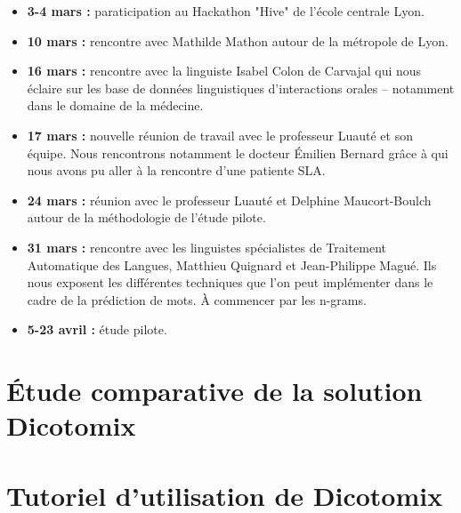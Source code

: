 \documentclass[11pt,a4paper]{article}
\theoremstyle{plain}
\theoremstyle{definition}
\begin{document}
\begin{itemize}
        \item \textbf{3-4 mars : } paraticipation au Hackathon "Hive" de l'école centrale Lyon. \\
        \item \textbf{10 mars : } rencontre avec Mathilde Mathon autour de la métropole de Lyon. \\
        \item \textbf{16 mars : } rencontre avec la linguiste Isabel Colon de Carvajal qui nous éclaire sur les base de données linguistiques d'interactions orales -- notamment 
        dans le domaine de la médecine. \\
        \item \textbf{17 mars : } nouvelle réunion de travail avec le professeur Luauté et son équipe. Nous rencontrons notamment le docteur Émilien Bernard 
        grâce à qui nous avons pu aller à la rencontre d'une patiente SLA. \\
        \item \textbf{24 mars : } réunion avec le professeur Luauté et Delphine Maucort-Boulch autour de la méthodologie de l'étude pilote. \\
        \item \textbf{31 mars : } rencontre avec les linguistes spécialistes de Traitement Automatique des Langues, Matthieu Quignard et Jean-Philippe Magué.
        Ils nous exposent les différentes techniques que l'on peut implémenter dans le cadre de la prédiction de mots. À commencer par les n-grams.
         \\
        \item \textbf{5-23 avril : } étude pilote. \\
    \end{itemize}       
    

\section{Étude comparative de la solution Dicotomix}

\section{Tutoriel d'utilisation de Dicotomix}

\end{document}

